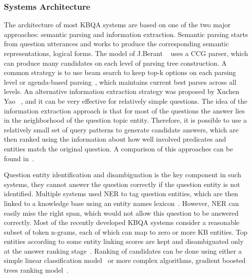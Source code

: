 \subsubsection{Systems Architecture}
\label{section:relatedwork:factoid:kbqa:architecture}

The architecture of most KBQA systems are based on one of the two major approaches: semantic parsing and information extraction.
Semantic parsing starts from question utterances and works to produce the corresponding semantic representations, \eg logical forms.
The model of J.Berant \etal~\cite{BerantCFL13:sempre} uses a CCG parser, which can produce many candidates on each level of parsing tree construction.
A common strategy is to use beam search to keep top-k options on each parsing level or agenda-based parsing~\cite{berant2015imitation}, which maintains current best parses across all levels.
An alternative information extraction strategy was proposed by Xuchen Yao \etal~\cite{YaoD14}, and it can be very effective for relatively simple questions.
The idea of the information extraction approach is that for most of the questions the answer lies in the neighborhood of the question topic entity.
Therefore, it is possible to use a relatively small set of query patterns to generate candidate answers, which are then ranked using the information about how well involved predicates and entities match the original question.
A comparison of this approaches can be found in~\cite{yao2014freebase}.

Question entity identification and disambiguation is the key component in such systems, they cannot answer the question correctly if the question entity is not identified.
Multiple systems used NER to tag question entities, which are then linked to a knowledge base using an entity names lexicon~\cite{BerantCFL13:sempre,BerantL14:parasempre,xu2014answering}.
However, NER can easily miss the right span, which would not allow this question to be answered correctly.
Most of the recently developed KBQA systems consider a reasonable subset of token n-grams, each of which can map to zero or more KB entities.
Top entities according to some entity linking scores are kept and disambiguated only at the answer ranking stage~\cite{bastmore:cikm:2015:aquu,yih:ACL:2015:STAGG,yao-scratch-qa-naacl2015}.
Ranking of candidates can be done using either a simple linear classification model~\cite{yao-scratch-qa-naacl2015} or more complex algorithms, \eg gradient boosted trees ranking model~\cite{bastmore:cikm:2015:aquu,yih:ACL:2015:STAGG}.


